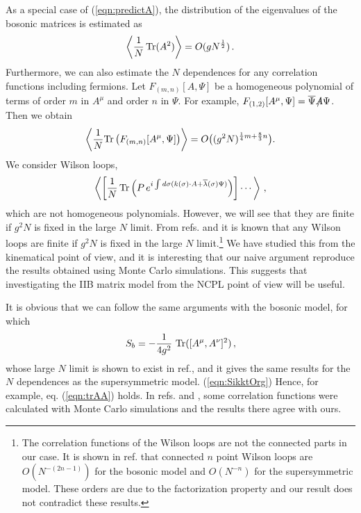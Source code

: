 \documentclass[12pt,a4paper]{article}
\newcommand{\Slash}[1]{\ooalign{\hfil/\hfil\crcr$#1$}}
\newcommand{\Tr}{\mbox{\rm Tr}}
\begin{document}
As a special case of (\ref{eqn:predictA}), the distribution of
the eigenvalues of the bosonic matrices is estimated as
\begin{equation}
  \left\langle\frac{1}{N}\,\Tr (A^2)\right\rangle
	= O(gN^{\frac{1}{2}})\,.\label{eqn:trAA}
\end{equation}
Furthermore, we can also estimate the $N$ dependences for any
correlation functions including fermions.
Let $F_{(m,n)}[A,\Psi]$ be a homogeneous polynomial
of terms of order $m$  in $A^\mu$ and order $n$ in $\Psi$.
For example, $F_{(1,2)}[A^\mu,\Psi]={\overline\Psi}{\Slash A}\Psi$.
Then we obtain
\begin{equation}
	\left\langle\frac{1}{N}
	\Tr \left(F_{(m,n)}[A^\mu,\Psi]\right)\right\rangle
	=O\bigl((g^2N)^{\frac{1}{4}m+\frac{8}{3}n}\bigr).\label{eqn:TrF}
\end{equation}
We consider Wilson loops,
\begin{equation}
  \left\langle\left[{\frac{1}{N}}\,\Tr \left( P\,
	e^{i\int d\sigma(k(\sigma)\cdot A+{\overline\lambda}(\sigma)\Psi)}
	\right)\right]\cdots\right\rangle\,,\label{eqn:WilsonLoop}
\end{equation}
which are not homogeneous polynomials. However, we will see that
they are finite if $g^2N$ is fixed in the large $N$ limit.
{}From refs. \cite{MCsimu,alpha} and \cite{AABHN} it is known
that any Wilson loops are finite if $g^2N$ is fixed in the large $N$
limit.\footnote{The correlation functions of the Wilson loops are not
the connected parts in our case. It is shown in ref.\cite{AABHN} that
connected $n$ point Wilson loops are $O(N^{-(2n-1)})$ for the bosonic
model and $O(N^{-n})$ for the supersymmetric model. These orders are
due to the factorization property and our result does not contradict
these results.}
We have studied this from the kinematical point of view, and
it is interesting that our naive argument reproduce the
results obtained using Monte Carlo simulations.
This suggests that investigating the IIB matrix model from the NCPL
point of view will be useful.

It is obvious that we can follow the same arguments with
the bosonic model, for which
\begin{equation}
  S_b=-\frac{1}{4g^2}~\Tr ([A^\mu,A^\nu]^2)\,,\label{eqn:Bmodel}
\end{equation}
whose large $N$ limit is shown to exist in ref.\cite{KS}, and it gives
the same results for the $N$ dependences as the supersymmetric model.
(\ref{eqn:SikktOrg})  Hence, for example, eq. (\ref{eqn:trAA}) holds.
In refs. \cite{MCsimu} and \cite{alpha}, some correlation functions
were calculated with Monte Carlo simulations and the results there agree
with ours.
\end{document}
